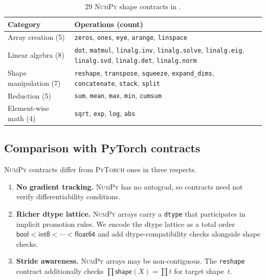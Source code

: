 \documentclass[11pt]{article}
\newcommand{\TShape}[1]{\mathsf{shape}(#1)}       %
\newcommand{\PyTorch}{\textsc{PyTorch}\xspace}
\newcommand{\NumPy}{\textsc{NumPy}\xspace}
\begin{document}
\begin{table}[H]
\centering
\caption{29 \NumPy shape contracts in \JuGeo.}
\label{tab:numpy}
\begin{tabularx}{\linewidth}{@{}lX@{}}
\toprule
\textbf{Category} & \textbf{Operations (count)} \\
\midrule
Array creation (5)
  & \texttt{zeros}, \texttt{ones}, \texttt{eye},
    \texttt{arange}, \texttt{linspace} \\
Linear algebra (8)
  & \texttt{dot}, \texttt{matmul},
    \texttt{linalg.inv}, \texttt{linalg.solve},
    \texttt{linalg.eig}, \texttt{linalg.svd},
    \texttt{linalg.det}, \texttt{linalg.norm} \\
Shape manipulation (7)
  & \texttt{reshape}, \texttt{transpose}, \texttt{squeeze},
    \texttt{expand\_dims}, \texttt{concatenate},
    \texttt{stack}, \texttt{split} \\
Reduction (5)
  & \texttt{sum}, \texttt{mean}, \texttt{max},
    \texttt{min}, \texttt{cumsum} \\
Element-wise math (4)
  & \texttt{sqrt}, \texttt{exp}, \texttt{log}, \texttt{abs} \\
\bottomrule
\end{tabularx}
\end{table}

\subsection{Comparison with PyTorch contracts}

\NumPy contracts differ from \PyTorch ones in three respects.

\begin{enumerate}[leftmargin=*]
\item \textbf{No gradient tracking.}  \NumPy has no autograd, so
      contracts need not verify differentiability conditions.
\item \textbf{Richer dtype lattice.}  \NumPy arrays carry a
      \texttt{dtype} that participates in implicit promotion rules.
      We encode the dtype lattice as a total order
      $\mathsf{bool} < \mathsf{int8} < \cdots < \mathsf{float64}$
      and add dtype-compatibility checks alongside shape checks.
\item \textbf{Stride awareness.}  \NumPy arrays may be non-contiguous.
      The \texttt{reshape} contract additionally checks
      $\prod \TShape{X} = \prod t$ for target shape~$t$.
\end{enumerate}
\end{document}

